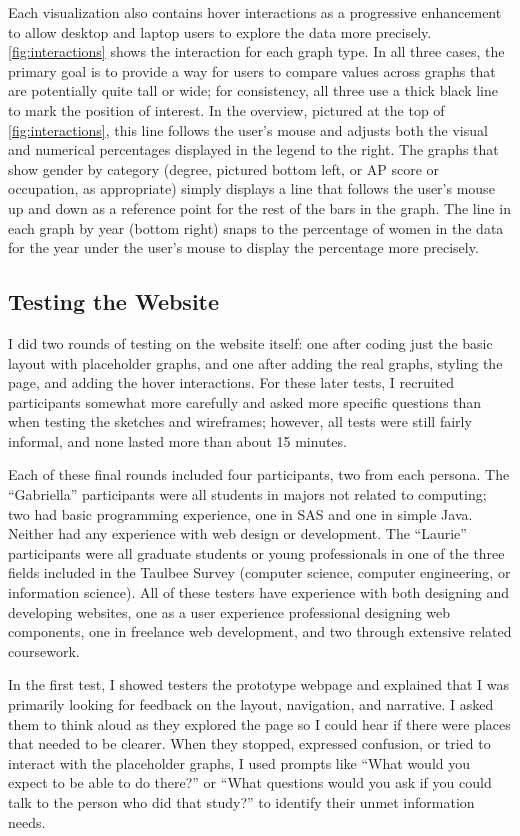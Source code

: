 Each visualization also contains hover interactions as a progressive enhancement to allow desktop and laptop users to explore the data more precisely. \autoref{fig:interactions} shows the interaction for each graph type. In all three cases, the primary goal is to provide a way for users to compare values across graphs that are potentially quite tall or wide; for consistency, all three use a thick black line to mark the position of interest. In the overview, pictured at the top of \autoref{fig:interactions}, this line follows the user's mouse and adjusts both the visual and numerical percentages displayed in the legend to the right. The graphs that show gender by category (degree, pictured bottom left, or AP score or occupation, as appropriate) simply displays a line that follows the user's mouse up and down as a reference point for the rest of the bars in the graph. The line in each graph by year (bottom right) snaps to the percentage of women in the data for the year under the user's mouse to display the percentage more precisely.

\subsection{Testing the Website}\label{sec:dev-testing}
I did two rounds of testing on the website itself: one after coding just the basic layout with placeholder graphs, and one after adding the real graphs, styling the page, and adding the hover interactions. For these later tests, I recruited participants somewhat more carefully and asked more specific questions than when testing the sketches and wireframes; however, all tests were still fairly informal, and none lasted more than about 15 minutes.

Each of these final rounds included four participants, two from each persona. The ``Gabriella'' participants were all students in majors not related to computing; two had basic programming experience, one in SAS and one in simple Java. Neither had any experience with web design or development. The ``Laurie'' participants were all graduate students or young professionals in one of the three fields included in the Taulbee Survey (computer science, computer engineering, or information science). All of these testers have experience with both designing and developing websites, one as a user experience professional designing web components, one in freelance web development, and two through extensive related coursework.

In the first test, I showed testers the prototype webpage and explained that I was primarily looking for feedback on the layout, navigation, and narrative. I asked them to think aloud as they explored the page so I could hear if there were places that needed to be clearer. When they stopped, expressed confusion, or tried to interact with the placeholder graphs, I used prompts like ``What would you expect to be able to do there?'' or ``What questions would you ask if you could talk to the person who did that study?'' to identify their unmet information needs.


